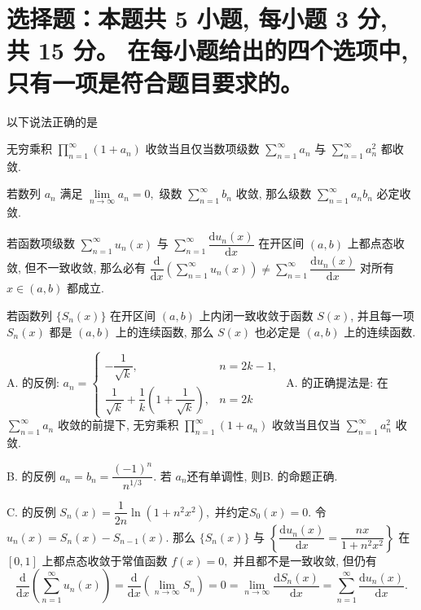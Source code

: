 


\makeexamtitle


\section{%
  选择题：本题共 5 小题, 每小题 3 分, 共 15 分。
  在每小题给出的四个选项中, 只有一项是符合题目要求的。
}


\begin{question}
以下说法正确的是 \paren[D]

\begin{choices}
\item 无穷乘积 $\prod\limits_{n=1}^{\infty} (1 + a_n)$ 收敛当且仅当数项级数 $\sum\limits_{n=1}^{\infty} a_n$ 与 $\sum\limits_{n=1}^{\infty} a_n^2$ 都收敛.
\item 若数列 $a_n$ 满足 $\lim\limits_{n \to \infty} a_n = 0,$ 级数 $\sum\limits_{n=1}^{\infty} b_n$ 收敛, 那么级数 $\sum\limits_{n=1}^{\infty} a_n b_n$ 必定收敛.
\item 若函数项级数 $\sum\limits_{n=1}^{\infty} u_n(x)$ 与 $\sum\limits_{n=1}^{\infty} \dfrac{\mathrm{d} u_n(x)}{\mathrm{d} x}$ 在开区间 $(a, b)$ 上都点态收敛, 但不一致收敛, 那么必有 $\dfrac{\mathrm{d}}{\mathrm{d} x} \left( \sum\limits_{n=1}^{\infty} u_n(x) \right) \neq \sum\limits_{n=1}^{\infty} \dfrac{\mathrm{d} u_n(x)}{\mathrm{d} x}$ 对所有 $x \in (a, b)$ 都成立.
\item 若函数列 $\{S_n(x)\}$ 在开区间 $(a, b)$ 上内闭一致收敛于函数 $S(x)$, 并且每一项 $S_n(x)$ 都是 $(a, b)$ 上的连续函数, 那么 $S(x)$ 也必定是 $(a, b)$ 上的连续函数.
\end{choices}
\end{question}

\begin{solution}
A. 的反例: $a_n = \begin{cases}
-\dfrac{1}{\sqrt{k}}, & n = 2k -1, \\
\dfrac{1}{\sqrt{k}} + \dfrac{1}{k} \left( 1 + \dfrac{1}{\sqrt{k}} \right), & n = 2k
\end{cases}$ A. 的正确提法是: 在 $\sum\limits_{n=1}^{\infty} a_n$ 收敛的前提下, 无穷乘积 $\prod\limits_{n=1}^{\infty} (1 + a_n)$ 收敛当且仅当 $\sum\limits_{n=1}^{\infty} a_n^2$ 收敛.

B. 的反例 $a_n = b_n = \dfrac{(-1)^n}{n^{1/3}}.$ 若 $a_n$还有单调性, 则B. 的命题正确.

C. 的反例 $S_n(x) = \dfrac{1}{2n} \ln{\left( 1 + n^2x^2 \right)},$ 并约定$S_0(x) = 0.$ 令 $u_n(x) = S_{n}(x) - S_{n-1}(x).$ 那么 $\{S_n(x)\}$ 与 $\left\{\dfrac{\mathrm{d} u_n(x)}{\mathrm{d} x} = \dfrac{nx}{1 + n^2x^2}\right\}$ 在 $[0,1]$ 上都点态收敛于常值函数 $f(x) = 0,$ 并且都不是一致收敛, 但仍有
\[\dfrac{\mathrm{d}}{\mathrm{d} x} \left( \sum\limits_{n=1}^{\infty} u_n(x) \right) = \dfrac{\mathrm{d}}{\mathrm{d} x} \left( \lim\limits_{n\to\infty} S_n \right) = 0 = \lim\limits_{n\to\infty} \dfrac{\mathrm{d} S_n(x)}{\mathrm{d} x} = \sum\limits_{n=1}^{\infty} \dfrac{\mathrm{d} u_n(x)}{\mathrm{d} x}.\]
\end{solution}

